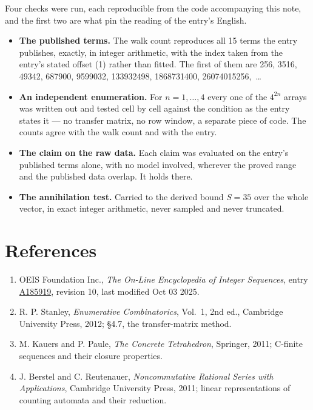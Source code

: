 \documentclass[11pt]{article}
\theoremstyle{definition}
\begin{document}
Four checks were run, each reproducible from the code accompanying this note, and the first two are what pin the reading of the entry's English.

\begin{itemize}

\item {\bfseries The published terms.} The walk count reproduces all 15 terms the entry publishes, exactly, in integer arithmetic, with the index taken from the entry's stated offset (1) rather than fitted. The first of them are 256, 3516, 49342, 687900, 9599032, 133932498, 1868731400, 26074015256,~\dots

\item {\bfseries An independent enumeration.} For $n = 1,\dots,4$ every one of the $4^{2n}$ arrays was written out and tested cell by cell against the condition as the entry states it --- no transfer matrix, no row window, a separate piece of code. The counts agree with the walk count and with the entry.

\item {\bfseries The claim on the raw data.} Each claim was evaluated on the entry's published terms alone, with no model involved, wherever the proved range and the published data overlap. It holds there.

\item {\bfseries The annihilation test.} Carried to the derived bound $S = 35$ over the whole vector, in exact integer arithmetic, never sampled and never truncated.

\end{itemize}

\section{References}

\begin{enumerate}

\item OEIS Foundation Inc., \emph{The On-Line Encyclopedia of Integer Sequences}, entry \href{https://oeis.org/A185919}{A185919}, revision 10, last modified Oct 03 2025.

\item R. P. Stanley, \emph{Enumerative Combinatorics}, Vol.~1, 2nd ed., Cambridge University Press, 2012; \S4.7, the transfer-matrix method.

\item M. Kauers and P. Paule, \emph{The Concrete Tetrahedron}, Springer, 2011; C-finite sequences and their closure properties.

\item J. Berstel and C. Reutenauer, \emph{Noncommutative Rational Series with Applications}, Cambridge University Press, 2011; linear representations of counting automata and their reduction.

\end{enumerate}
\end{document}
